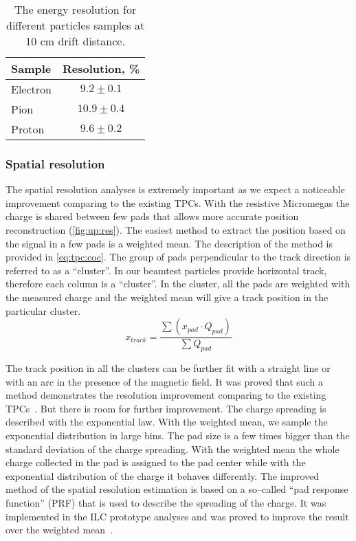 \documentclass[../main.tex]{subfiles}
\begin{document}
\begin{table}[!ht]
  \centering
  \begin{tabular}{|l|c|}
  \hline
  \hline
  Sample    & Resolution, \% \\
  \hline
  Electron  & $9.2\pm0.1$ \\
  Pion      & $10.9\pm0.4$ \\
  Proton    & $9.6\pm0.2$ \\
  \hline
  \end{tabular}
  \caption{The energy resolution for different particles samples at 10 cm drift distance.}
  \label{tbl:tpc:cern_dedx}
\end{table}

\subsubsection{Spatial resolution}
The spatial resolution analyses is extremely important as we expect a noticeable improvement comparing to the existing TPCs. With the resistive Micromegas the charge is shared between few pads that allows more accurate position reconstruction (\autoref{fig:up:res}). The easiest method to extract the position based on the signal in a few pads is a weighted mean. The description of the method is provided in \autoref{eq:tpc:coc}. The group of pads perpendicular to the track direction is referred to as a ``cluster''. In our beamtest particles provide horizontal track, therefore each column is a ``cluster''. In the cluster, all the pads are weighted with the measured charge and the weighted mean will give a track position in the particular cluster.
\begin{equation}
\label{eq:tpc:coc}
x_{track} = \frac{\sum (x_{pad} \cdot Q_{pad})}{\sum Q_{pad}}
\end{equation}

The track position in all the clusters can be further fit with a straight line or with an arc in the presence of the magnetic field. It was proved that such a method demonstrates the resolution improvement comparing to the existing TPCs~\cite{Dixit2004}. But there is room for further improvement. The charge spreading is described with the exponential law. With the weighted mean, we sample the exponential distribution in large bins. The pad size is a few times bigger than the standard deviation of the charge spreading. With the weighted mean the whole charge collected in the pad is assigned to the pad center while with the exponential distribution of the charge it behaves differently. The improved method of the spatial resolution estimation is based on a so--called ``pad response function'' (PRF) that is used to describe the spreading of the charge. It was implemented in the ILC prototype analyses and was proved to improve the result over the weighted mean~\cite{Attie2011}.
\end{document}
